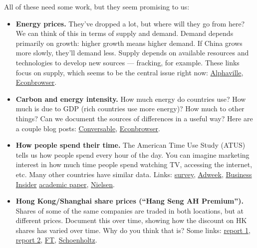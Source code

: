 \documentclass[11pt]{article}
\begin{document}
All of these need some work, but they seem promising to us:  
\begin{itemize} 
\item {\bf Energy prices.\/}  
They've dropped a lot, but where will they go from here?  We can think of this in terms of supply and demand.  Demand depends primarily on growth:  higher growth means higher demand.  If China grows more slowly, they’ll demand less.  Supply depends on available resources and technologies to develop new sources --- fracking, for example.  These links focus on supply, which seems to be the central issue right now:  
\href{http://ftalphaville.ft.com/2015/09/11/2139891/oil-absolutely-friggin-everywhere/}{Alphaville},  
\href{http://econbrowser.com/archives/2014/11/a-glut-of-oil}{Econbrowser}. 

\item {\bf Carbon and energy intensity.}    
How much energy do countries use?  How much is due to GDP (rich countries use more energy)?  How much to other things?  Can we document the sources of differences in a useful way?  Here are a couple blog posts:
\href{http://conversableeconomist.blogspot.com/2015/07/global-carbon-intensity-rises-kaya.html}
{Conversable}, 
\href{http://econbrowser.com/archives/2014/06/energy-demand-and-gdp}{Econbrowser}.  

\item {\bf How people spend their time.}   
The American Time Use Study (ATUS) tells us how people spend every hour of the day.  You can imagine marketing interest in how much time people spend watching TV, accessing the internet, etc.  Many other countries have similar data.  Links:
\href{http://scholar.princeton.edu/sites/default/files/annurev-economics-111809-125129_0.pdf}{survey},  
\href{http://www.adweek.com/socialtimes/time-spent-online/613474}{Adweek}, \href{http://www.businessinsider.com/how-much-time-people-spend-online-2013-10}{Business Insider} \href{http://www.nber.org/papers/w19549}{academic paper}, \href{http://www.nielsen.com/us/en/insights/news/2014/whats-empowering-the-new-digital-consumer.html}
{Nielsen}. 

\item {\bf Hong Kong/Shanghai share prices (``Hang Seng AH Premium'').}  
Shares of some of the same companies are traded in both locations, but at different prices.  Document this over time, showing how the discount on HK shares has varied over time.  Why do you think that is?  Some links:
\href{http://www.hsi.com.hk/HSI-Net/static/revamp/contents/en/dl_centre/factsheets/FS_AHPe.pdf}
{report 1},
\href{http://www.hsi.com.hk/HSI-Net/}{report 2}, 
\href{http://markets.ft.com/research/Markets/Tearsheets/Summary?s=HSCAHPI:HKG}{FT}, 
\href{http://www.moneyandbanking.com/commentary/2015/7/6/chinas-stock-market-boom-and-bust}
{Schoenholtz}.  


\end{itemize}
\end{document}
